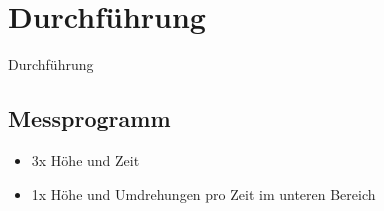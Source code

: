 \section{Durchführung}
\begin{frame}{Durchführung}
    \subsection{Messprogramm}

\begin{itemize}
    \item 3x Höhe und Zeit %
    \item 1x Höhe und Umdrehungen pro Zeit im unteren Bereich %
\end{itemize}

\end{frame}



